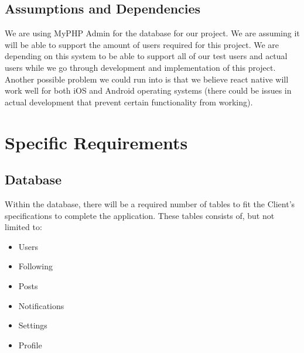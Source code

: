 \documentclass[letterpaper, 10, draftclsnofoot, onecolumn]{IEEEtran}
\begin{document}

\subsection{Assumptions and Dependencies}
We are using MyPHP Admin for the database for our project. We are assuming it will be able to support the amount of users required for this project. We are depending on this system to be able to support all of our test users and actual users while we go through development and implementation of this project. Another possible problem we could run into is that we believe react native will work well for both iOS and Android operating systems (there could be issues in actual development that prevent certain functionality from working).



\section{Specific Requirements}

\subsection{Database}
\indent Within the database, there will be a required number of tables to fit the Client's specifications to complete the application. These tables consists of, but not limited to:
\begin{itemize}
\item Users
\item Following
\item Posts
\item Notifications
\item Settings
\item Profile
\end{itemize}
\end{document}

